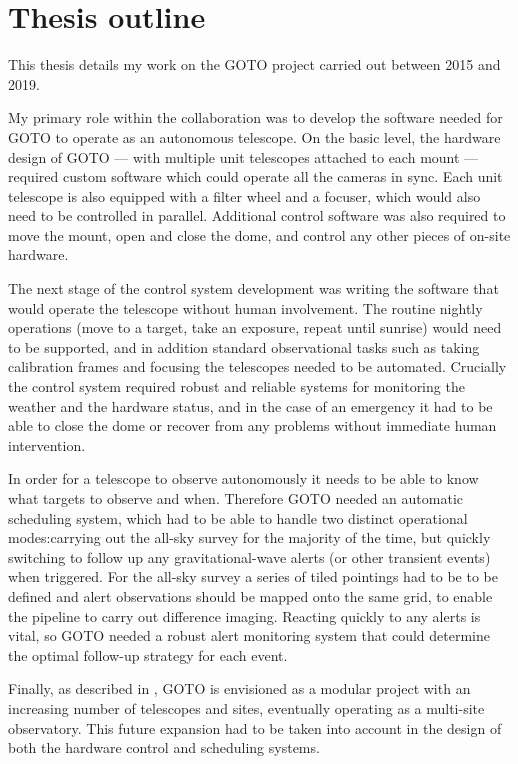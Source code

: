 \section{Thesis outline}
\label{sec:outline}
\begin{colsection}

This thesis details my work on the GOTO project carried out between 2015 and 2019.

My primary role within the collaboration was to develop the software needed for GOTO to operate as an autonomous telescope. On the basic level, the hardware design of GOTO --- with multiple unit telescopes attached to each mount --- required custom software which could operate all the cameras in sync. Each unit telescope is also equipped with a filter wheel and a focuser, which would also need to be controlled in parallel. Additional control software was also required to move the mount, open and close the dome, and control any other pieces of on-site hardware.

The next stage of the control system development was writing the software that would operate the telescope without human involvement. The routine nightly operations (move to a target, take an exposure, repeat until sunrise) would need to be supported, and in addition standard observational tasks such as taking calibration frames and focusing the telescopes needed to be automated. Crucially the control system required robust and reliable systems for monitoring the weather and the hardware status, and in the case of an emergency it had to be able to close the dome or recover from any problems without immediate human intervention.

In order for a telescope to observe autonomously it needs to be able to know what targets to observe and when. Therefore GOTO needed an automatic scheduling system, which had to be able to handle two distinct operational modes:\@ carrying out the all-sky survey for the majority of the time, but quickly switching to follow up any gravitational-wave alerts (or other transient events) when triggered. For the all-sky survey a series of tiled pointings had to be to be defined and alert observations should be mapped onto the same grid, to enable the pipeline to carry out difference imaging. Reacting quickly to any alerts is vital, so GOTO needed a robust alert monitoring system that could determine the optimal follow-up strategy for each event.

Finally, as described in , GOTO is envisioned as a modular project with an increasing number of telescopes and sites, eventually operating as a multi-site observatory. This future expansion had to be taken into account in the design of both the hardware control and scheduling systems.


\end{colsection}
